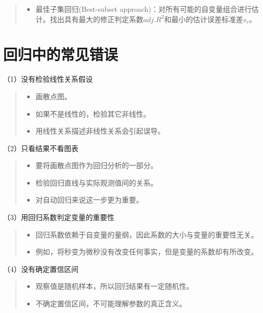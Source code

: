 \documentclass[]{ctexbook}
\providecommand{\tightlist}{%
  \setlength{\itemsep}{0pt}\setlength{\parskip}{0pt}}
\begin{document}
\begin{quote}
\begin{itemize}
\tightlist
\item
  最佳子集回归(Best-subset approach)：对所有可能的自变量组合进行估计。找出具有最大的修正判定系数\(adj.R^2\)和最小的估计误差标准差\(s_{\epsilon}\)。
\end{itemize}
\end{quote}

\hypertarget{ux56deux5f52ux4e2dux7684ux5e38ux89c1ux9519ux8bef}{%
\section{回归中的常见错误}\label{ux56deux5f52ux4e2dux7684ux5e38ux89c1ux9519ux8bef}}

（1）没有检验线性关系假设

\begin{quote}
\begin{itemize}
\tightlist
\item
  画散点图。
\item
  如果不是线性的，检验其它非线性。
\item
  用线性关系描述非线性关系会引起误导。
\end{itemize}
\end{quote}

（2）只看结果不看图表

\begin{quote}
\begin{itemize}
\tightlist
\item
  要将画散点图作为回归分析的一部分。
\item
  检验回归直线与实际观测值间的关系。
\item
  对自动回归来说这一步更为重要。
\end{itemize}
\end{quote}

（3）用回归系数判定变量的重要性

\begin{quote}
\begin{itemize}
\tightlist
\item
  回归系数依赖于自变量的量纲，因此系数的大小与变量的重要性无关。
\item
  例如，将秒变为微秒没有改变任何事实，但是变量的系数却有所改变。
\end{itemize}
\end{quote}

（4）没有确定置信区间

\begin{quote}
\begin{itemize}
\tightlist
\item
  观察值是随机样本，所以回归结果有一定随机性。
\item
  不确定置信区间，不可能理解参数的真正含义。
\end{itemize}
\end{quote}
\end{document}
